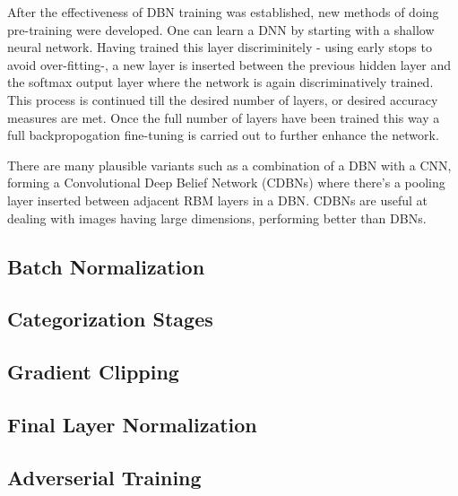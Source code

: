 After the effectiveness of DBN training was established, new methods of doing pre-training were developed. 
One can learn a DNN by starting with a shallow neural network.
Having trained this layer discriminitely - using early stops to avoid over-fitting-, a new layer is inserted between the previous hidden layer and the softmax output layer where the network is again discriminatively trained.
This process is continued till the desired number of layers, or desired accuracy measures are met.
Once the full number of layers have been trained this way a full backpropogation fine-tuning is carried out to further enhance the network\citep{dengthree}.

There are many plausible variants such as a combination of a DBN with a CNN, forming a Convolutional Deep Belief Network (CDBNs) where there’s a pooling layer inserted between adjacent RBM layers in a DBN\citep{mo2012survey}.
CDBNs are useful at dealing with images having large dimensions, performing better than DBNs\citep{mo2012survey}.


        
        
        
		\subsection{Batch Normalization}
        
        
        
        \subsection{Categorization Stages} 
        
        
        
        \subsection{Gradient Clipping}  
        
        
        
        \subsection{Final Layer Normalization} 
        
        
        
	 \subsection{Adverserial Training}
        
